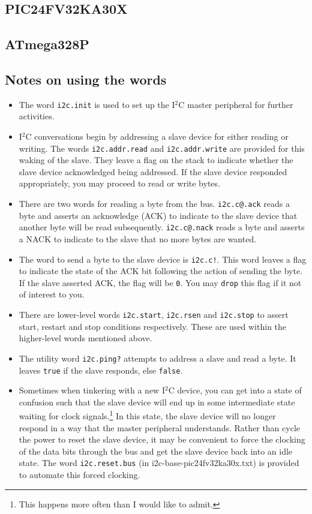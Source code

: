 \documentclass[12pt,a4paper]{article}
\newcommand{\code}[2]{
 \hrulefill
 \scriptsize
 
 \hrulefill
 \vspace{2em}
 \normalsize
}
\begin{document}
\subsection{PIC24FV32KA30X}
\code{}{../pic24/i2c-base-pic24fv32ka30x.txt}

\subsection{ATmega328P}
\code{}{../avr8-2016/i2c-base-avr.txt}

\subsection{Notes on using the words}
\begin{itemize}
  \item The word \verb!i2c.init! is used to set up the I$^2$C master peripheral for further activities.
  \item I$^2$C conversations begin by addressing a slave device for either reading or writing.
    The words \verb!i2c.addr.read! and \verb!i2c.addr.write! are provided for this waking of the slave.
    They leave a flag on the stack to indicate whether the slave device acknowledged being addressed.
    If the slave device responded appropriately, you may proceed to read or write bytes.
  \item There are two words for reading a byte from the bus.  
    \verb!i2c.c@.ack! reads a byte and asserts an acknowledge (ACK) to indicate to the slave device that
    another byte will be read subsequently.
    \verb!i2c.c@.nack! reads a byte and asserts a NACK to indicate to the slave that no more bytes are wanted.
  \item The word to send a byte to the slave device is \verb?i2c.c!?.
    This word leaves a flag to indicate the state of the ACK bit following the action of sending the byte.
    If the slave asserted ACK, the flag will be \verb!0!.
    You may \verb!drop! this flag if it not of interest to you.
  \item There are lower-level words \verb!i2c.start!, \verb!i2c.rsen! and \verb!i2c.stop! to assert
    start, restart and stop conditions respectively.
    These are used within the higher-level words mentioned above.
  \item The utility word \verb!i2c.ping?! attempts to address a slave and read a byte.
    It leaves \verb!true! if the slave responds, else \verb!false!.
  \item Sometimes when tinkering with a new I$^2$C device,
    you can get into a state of confusion such that the slave device will end up in some intermediate state
    waiting for clock signals.\footnote{This happens more often than I would like to admit.}
    In this state, the slave device will no longer respond in a way that the master peripheral understands.
    Rather than cycle the power to reset the slave device, it may be convenient to force the clocking
    of the data bits through the bus and get the slave device back into an idle state.
    The word \verb!i2c.reset.bus! (in i2c-base-pic24fv32ka30x.txt) is provided to automate this
    forced clocking.
\end{itemize}
\end{document}
